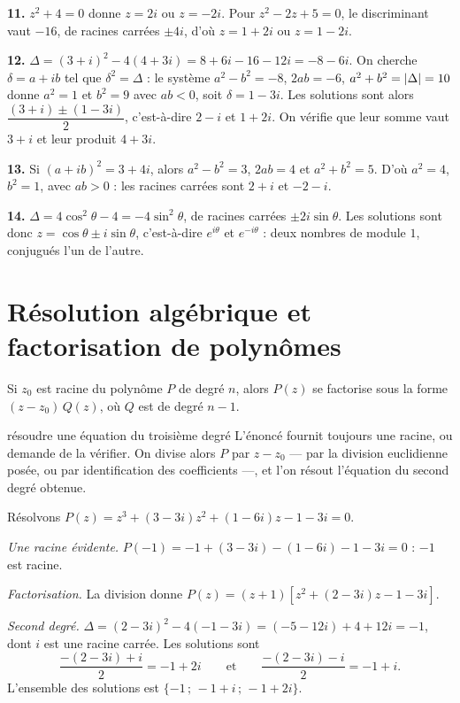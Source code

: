 \begin{corrige}
\textbf{11.} $z^{2}+4 = 0$ donne $z = 2i$ ou $z = -2i$. Pour
$z^{2}-2z+5 = 0$, le discriminant vaut $-16$, de racines carrées $\pm4i$,
d'où $z = 1+2i$ ou $z = 1-2i$.

\textbf{12.} $\Delta = (3+i)^{2}-4(4+3i) = 8+6i-16-12i = -8-6i$. On cherche
$\delta = a+ib$ tel que $\delta^{2} = \Delta$ : le système
$a^{2}-b^{2} = -8$, $2ab = -6$, $a^{2}+b^{2} = \left|\Delta\right| = 10$ donne
$a^{2} = 1$ et $b^{2} = 9$ avec $ab<0$, soit $\delta = 1-3i$. Les solutions
sont alors $\dfrac{(3+i)\pm(1-3i)}{2}$, c'est-à-dire $2-i$ et $1+2i$. On
vérifie que leur somme vaut $3+i$ et leur produit $4+3i$.

\textbf{13.} Si $(a+ib)^{2} = 3+4i$, alors $a^{2}-b^{2} = 3$, $2ab = 4$ et
$a^{2}+b^{2} = 5$. D'où $a^{2} = 4$, $b^{2} = 1$, avec $ab>0$ : les racines
carrées sont $2+i$ et $-2-i$.

\textbf{14.} $\Delta = 4\cos^{2}\theta-4 = -4\sin^{2}\theta$, de racines
carrées $\pm2i\sin\theta$. Les solutions sont donc
$z = \cos\theta \pm i\sin\theta$, c'est-à-dire $e^{i\theta}$ et
$e^{-i\theta}$ : deux nombres de module $1$, conjugués l'un de l'autre.
\end{corrige}

\section{Résolution algébrique et factorisation de polynômes}

\begin{propriete}
Si $z_{0}$ est racine du polynôme $P$ de degré $n$, alors $P(z)$ se factorise
sous la forme $(z-z_{0})\,Q(z)$, où $Q$ est de degré $n-1$.
\end{propriete}

\begin{methode}{résoudre une équation du troisième degré}
L'énoncé fournit toujours une racine, ou demande de la vérifier. On divise
alors $P$ par $z-z_{0}$ — par la division euclidienne posée, ou par
identification des coefficients —, et l'on résout l'équation du second degré
obtenue.
\end{methode}

\begin{exemple}
Résolvons $P(z) = z^{3}+(3-3i)z^{2}+(1-6i)z-1-3i = 0$.

\emph{Une racine évidente.}
$P(-1) = -1+(3-3i)-(1-6i)-1-3i = 0$ : $-1$ est racine.

\emph{Factorisation.} La division donne
$P(z) = (z+1)\left[z^{2}+(2-3i)z-1-3i\right]$.

\emph{Second degré.}
$\Delta = (2-3i)^{2}-4(-1-3i) = (-5-12i)+4+12i = -1$, dont $i$ est une racine
carrée. Les solutions sont
\[
  \frac{-(2-3i)+i}{2} = -1+2i
  \qquad\text{et}\qquad
  \frac{-(2-3i)-i}{2} = -1+i .
\]
L'ensemble des solutions est $\{-1\,;\,-1+i\,;\,-1+2i\}$.
\end{exemple}

